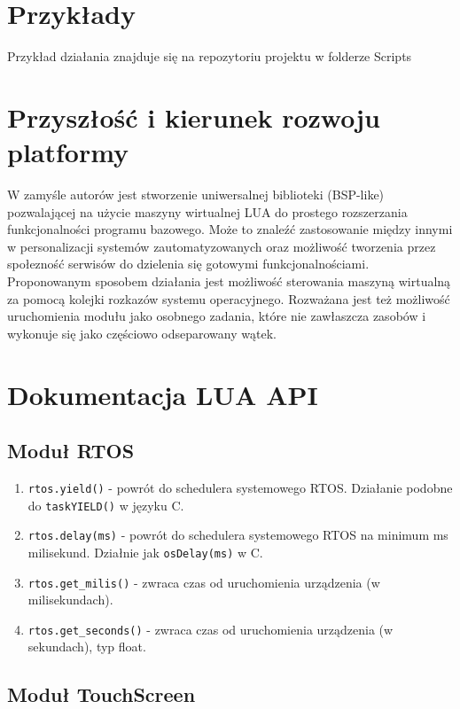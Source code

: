 \documentclass{article}
\begin{document}
\section{Przykłady}
Przykład działania znajduje się na repozytoriu projektu w folderze Scripts

\section{Przyszłość i kierunek rozwoju platformy}
W zamyśle autorów jest stworzenie uniwersalnej biblioteki (BSP-like) pozwalającej na użycie maszyny wirtualnej LUA do prostego rozszerzania 
funkcjonalności programu bazowego. Może to znaleźć zastosowanie między innymi w personalizacji systemów zautomatyzowanych oraz możliwość 
tworzenia przez społezność serwisów do dzielenia się gotowymi funkcjonalnościami.\\
Proponowanym sposobem działania jest możliwość sterowania maszyną wirtualną za pomocą kolejki rozkazów systemu operacyjnego. 
Rozważana jest też możliwość uruchomienia modułu jako osobnego zadania, które nie zawłaszcza zasobów i wykonuje się jako częściowo odseparowany wątek.


\section{Dokumentacja LUA API}

\subsection{Moduł RTOS}

\begin{enumerate}
  \item \texttt{rtos.yield()} - powrót do schedulera systemowego RTOS. Działanie podobne do \texttt{taskYIELD()} w języku C.
  \item \texttt{rtos.delay(ms)} - powrót do schedulera systemowego RTOS na minimum ms milisekund. Działnie jak \texttt{osDelay(ms)} w C.
  \item \texttt{rtos.get\_milis()} - zwraca czas od uruchomienia urządzenia (w milisekundach).
  \item \texttt{rtos.get\_seconds()} - zwraca czas od uruchomienia urządzenia (w sekundach), typ float.
\end{enumerate}

\subsection{Moduł TouchScreen}
\end{document}
